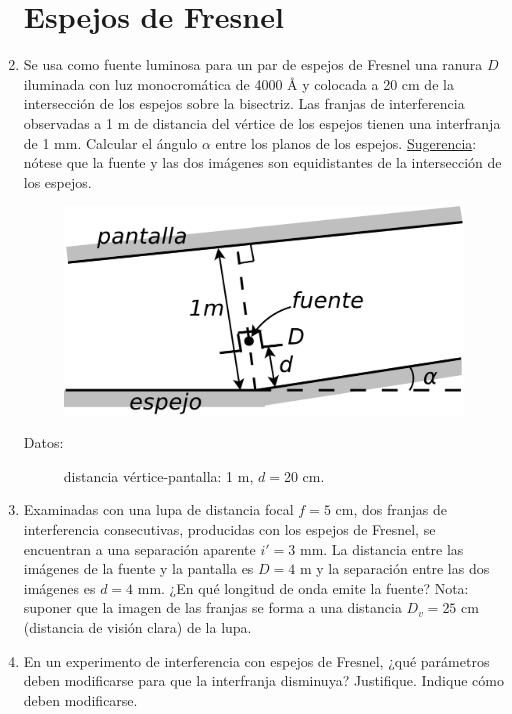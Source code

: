 \documentclass[11pt,spanish,a4paper]{article}
\begin{document}
\begin{enumerate}
\section*{Espejos de Fresnel}
\item Se usa como fuente luminosa para un par de espejos de Fresnel una
ranura $D$ iluminada con luz monocromática de 4000 Å y colocada a
20 cm de la intersección de los espejos sobre la bisectriz. Las franjas
de interferencia observadas a 1 m de distancia del vértice de los
espejos tienen una interfranja de 1 mm. Calcular el ángulo $\alpha$
entre los planos de los espejos. \underline{Sugerencia}: nótese que
la fuente y las dos imágenes son equidistantes de la intersección
de los espejos. 
\begin{figure}[H]
\centering{}\includegraphics[clip,scale=0.25]{ej5-8}
\end{figure}


\begin{description}
\item [{Datos:}] distancia vértice-pantalla: 1 m, $d=$20 cm.
\end{description}


\item Examinadas con una lupa de distancia focal $f=5$ cm, dos franjas
de interferencia consecutivas, producidas con los espejos de Fresnel,
se encuentran a una separación aparente $i'=3$ mm. La distancia entre
las imágenes de la fuente y la pantalla es $D=4$ m y la separación
entre las dos imágenes es $d=4$ mm. ¿En qué longitud de onda emite
la fuente? Nota: suponer que la imagen de las franjas se forma a una
distancia $D_{v}=25$ cm (distancia de visión clara) de la lupa.
\item En un experimento de interferencia con espejos de Fresnel, ¿qué parámetros
deben modificarse para que la interfranja disminuya? Justifique. Indique
cómo deben modificarse.



\end{enumerate}
\end{document}
